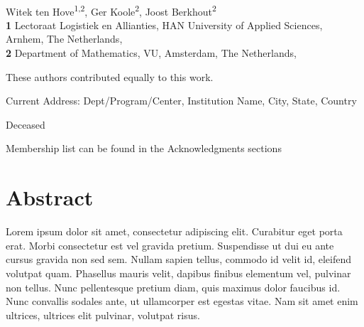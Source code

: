 \documentclass[
  10pt,
  letterpaper,
]{article}
\begin{document}
\vspace*{0.2in}

\begin{flushleft}
{\Large
\textbf{} %
}
\newline
\\
Witek ten Hove\textsuperscript{1,2\Yinyang}, Ger
Koole\textsuperscript{2\Yinyang}, Joost
Berkhout\textsuperscript{2\Yinyang}
\\
\bigskip
\textbf{1} Lectoraat Logistiek en Allianties, HAN University of Applied
Sciences, Arnhem, The Netherlands, \\ \textbf{2} Department of
Mathematics, VU, Amsterdam, The Netherlands, 
\bigskip

% 
%
\Yinyang These authors contributed equally to this work.


\textcurrency Current Address: Dept/Program/Center, Institution Name, City, State, Country %

\dag Deceased

\textpilcrow Membership list can be found in the Acknowledgments
sections


\end{flushleft}

\section*{Abstract}
Lorem ipsum dolor sit amet, consectetur adipiscing elit. Curabitur eget
porta erat. Morbi consectetur est vel gravida pretium. Suspendisse ut
dui eu ante cursus gravida non sed sem. Nullam sapien tellus, commodo id
velit id, eleifend volutpat quam. Phasellus mauris velit, dapibus
finibus elementum vel, pulvinar non tellus. Nunc pellentesque pretium
diam, quis maximus dolor faucibus id. Nunc convallis sodales ante, ut
ullamcorper est egestas vitae. Nam sit amet enim ultrices, ultrices elit
pulvinar, volutpat risus.
\end{document}
